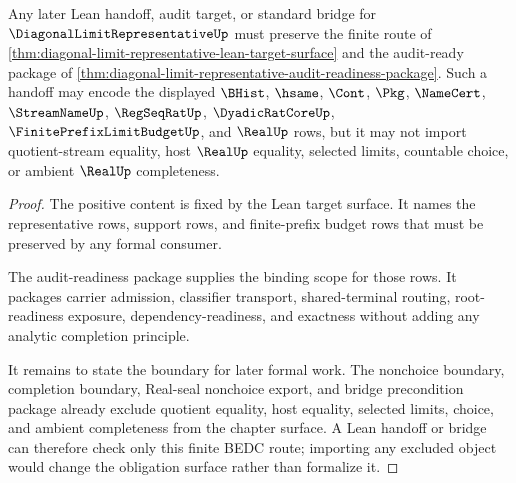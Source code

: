\begin{theorem}
\label{thm:diagonal-limit-representative-formal-handoff-boundary}
Any later Lean handoff, audit target, or standard bridge for $\DiagonalLimitRepresentativeUp$ must preserve the finite route of \autoref{thm:diagonal-limit-representative-lean-target-surface} and the audit-ready package of \autoref{thm:diagonal-limit-representative-audit-readiness-package}. Such a handoff may encode the displayed $\BHist$, $\hsame$, $\Cont$, $\Pkg$, $\NameCert$, $\StreamNameUp$, $\RegSeqRatUp$, $\DyadicRatCoreUp$, $\FinitePrefixLimitBudgetUp$, and $\RealUp$ rows, but it may not import quotient-stream equality, host $\RealUp$ equality, selected limits, countable choice, or ambient $\RealUp$ completeness.
\end{theorem}
\begin{proof}
The positive content is fixed by the Lean target surface. It names the representative rows, support rows, and finite-prefix budget rows that must be preserved by any formal consumer.

The audit-readiness package supplies the binding scope for those rows. It packages carrier admission, classifier transport, shared-terminal routing, root-readiness exposure, dependency-readiness, and exactness without adding any analytic completion principle.

It remains to state the boundary for later formal work. The nonchoice boundary, completion boundary, Real-seal nonchoice export, and bridge precondition package already exclude quotient equality, host equality, selected limits, choice, and ambient completeness from the chapter surface. A Lean handoff or bridge can therefore check only this finite BEDC route; importing any excluded object would change the obligation surface rather than formalize it.
\end{proof}


